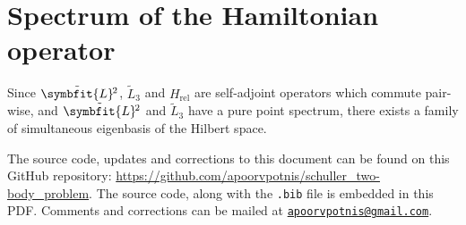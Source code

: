 \documentclass[12pt, a4 paper]{article}
\theoremstyle{definition}
\newcommand{\lvecsquare}{\tilde{\symbfit{L}}\kern-1pt^2}
\begin{document}
	\section{Spectrum of the Hamiltonian operator}

	Since $\lvecsquare$, $\tilde{L}_3$ and $H_\text{rel}$ are self-adjoint operators which commute pair-wise, and $\lvecsquare$ and $\tilde{L}_3$ have a pure point spectrum, there exists a family of simultaneous eigenbasis of the Hilbert space.















%

	\nocite{*}
	\printbibliography[heading=bibintoc]

	\par\begin{spacing}{0.6}
		{\footnotesize The source code, updates and corrections to this document can be found on this GitHub repository: \url{https://github.com/apoorvpotnis/schuller_two-body_problem}. The source code, along with the \texttt{.bib} file is embedded in this PDF. Comments and corrections can be mailed at \href{mailto:apoorvpotnis@gmail.com}{\texttt{apoorvpotnis@gmail.com}}.}
	\end{spacing}
\end{document}
